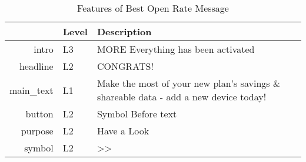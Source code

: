 \begin{table}[ht]
\centering
\caption{Features of Best Open Rate Message} 
\label{tab:best_open}
\begin{tabular}{rll}
  \hline
 & Level & Description \\ 
  \hline
intro & L3 & MORE Everything has been activated \\ 
  headline & L2 & CONGRATS! \\ 
  main\_text & L1 & Make the most of your new plan’s savings \& shareable data - add a new device today! \\ 
  button & L2 & Symbol Before text \\ 
  purpose & L2 & Have a Look \\ 
  symbol & L2 & >> \\ 
   \hline
\end{tabular}
\end{table}
